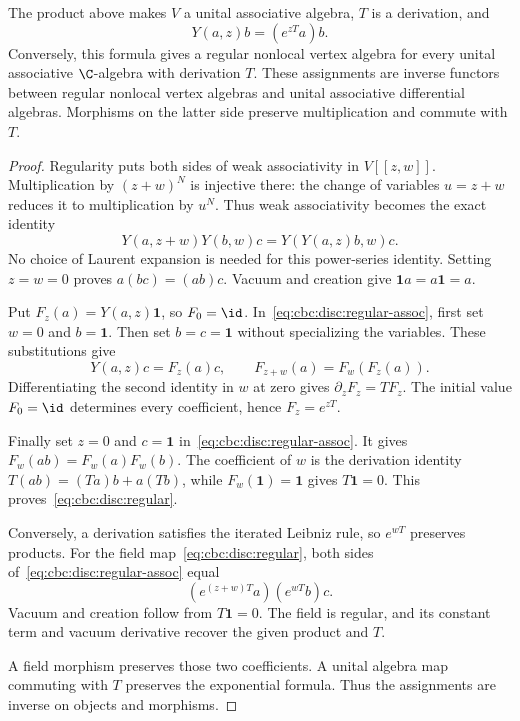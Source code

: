 \begin{theorem}\label{cbc:disc:regular}
The product above makes $V$ a unital associative algebra, $T$ is a derivation, and
\begin{equation}\label{eq:cbc:disc:regular}
 Y(a,z)b=(e^{zT}a)b.
\end{equation}
Conversely, this formula gives a regular nonlocal vertex algebra for every unital associative $\C$-algebra with derivation $T$.
These assignments are inverse functors between regular nonlocal vertex algebras and unital associative differential algebras.
Morphisms on the latter side preserve multiplication and commute with $T$.
\end{theorem}
\begin{proof}
Regularity puts both sides of weak associativity in $V[[z,w]]$.
Multiplication by $(z+w)^N$ is injective there: the change of variables $u=z+w$ reduces it to multiplication by $u^N$.
Thus weak associativity becomes the exact identity
\begin{equation}\label{eq:cbc:disc:regular-assoc}
 Y(a,z+w)Y(b,w)c=Y(Y(a,z)b,w)c.
\end{equation}
No choice of Laurent expansion is needed for this power-series identity.
Setting $z=w=0$ proves $a(bc)=(ab)c$.
Vacuum and creation give $\mathbf1a=a\mathbf1=a$.

Put $F_z(a)=Y(a,z)\mathbf1$, so $F_0=\id$.
In~\eqref{eq:cbc:disc:regular-assoc}, first set $w=0$ and $b=\mathbf1$.
Then set $b=c=\mathbf1$ without specializing the variables.
These substitutions give
\[
 Y(a,z)c=F_z(a)c,\qquad F_{z+w}(a)=F_w(F_z(a)).
\]
Differentiating the second identity in $w$ at zero gives
$\partial_zF_z=TF_z$.
The initial value $F_0=\id$ determines every coefficient, hence
$F_z=e^{zT}$.

Finally set $z=0$ and $c=\mathbf1$ in~\eqref{eq:cbc:disc:regular-assoc}.
It gives $F_w(ab)=F_w(a)F_w(b)$.
The coefficient of $w$ is the derivation identity
$T(ab)=(Ta)b+a(Tb)$, while $F_w(\mathbf1)=\mathbf1$ gives $T\mathbf1=0$.
This proves~\eqref{eq:cbc:disc:regular}.

Conversely, a derivation satisfies the iterated Leibniz rule, so $e^{wT}$ preserves products.
For the field map~\eqref{eq:cbc:disc:regular}, both sides of~\eqref{eq:cbc:disc:regular-assoc} equal
\[
 (e^{(z+w)T}a)(e^{wT}b)c.
\]
Vacuum and creation follow from $T\mathbf1=0$.
The field is regular, and its constant term and vacuum derivative recover the given product and $T$.

A field morphism preserves those two coefficients.
A unital algebra map commuting with $T$ preserves the exponential formula.
Thus the assignments are inverse on objects and morphisms.
\end{proof}


